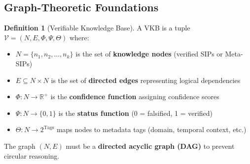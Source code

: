 \documentclass[11pt,a4paper]{article}
\theoremstyle{definition}
\newtheorem{definition}{Definition}[section]
\theoremstyle{remark}
\newcommand{\RR}{\mathbb{R}}
\newcommand{\VKB}{\textsc{VKB}}
\newcommand{\SIP}{\textsc{SIP}}
\begin{document}
\subsection{Graph-Theoretic Foundations}

\begin{definition}[Verifiable Knowledge Base]
A \VKB{} is a tuple $\mathcal{V} = (N, E, \Phi, \Psi, \Theta)$ where:
\begin{itemize}
    \item $N = \{n_1, n_2, \ldots, n_k\}$ is the set of \textbf{knowledge nodes} (verified \SIP{}s or Meta-\SIP{}s)
    \item $E \subseteq N \times N$ is the set of \textbf{directed edges} representing logical dependencies
    \item $\Phi: N \to \RR^+$ is the \textbf{confidence function} assigning confidence scores
    \item $\Psi: N \to \{0,1\}$ is the \textbf{status function} (0 = falsified, 1 = verified)
    \item $\Theta: N \to 2^{\text{Tags}}$ maps nodes to metadata tags (domain, temporal context, etc.)
\end{itemize}
The graph $(N, E)$ must be a \textbf{directed acyclic graph (DAG)} to prevent circular reasoning.
\end{definition}
\end{document}
